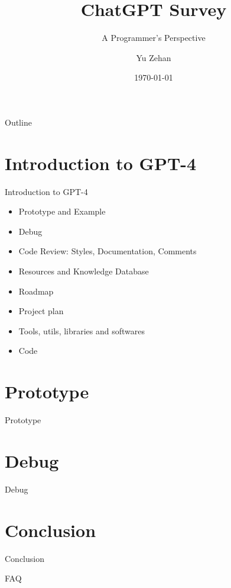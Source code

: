 \documentclass{beamer}
\title{ChatGPT Survey}
\subtitle{A Programmer's Perspective}
\author{Yu Zehan}
\institute{Intel FLEX}
\date{\today}
\begin{document}
\begin{frame}
  \titlepage
\end{frame}

\begin{frame}{Outline}
  \tableofcontents
\end{frame}

\section{Introduction to GPT-4}
\begin{frame}{Introduction to GPT-4}
  \begin{itemize}
    \item Prototype and Example
    \item Debug
    \item Code Review: Styles, Documentation, Comments
    \item Resources and Knowledge Database
    \item Roadmap
    \item Project plan
    \item Tools, utils, libraries and softwares
    \item Code 
  \end{itemize}
\end{frame}

\section{Prototype}
\begin{frame}{Prototype}
\end{frame}

\section{Debug}
\begin{frame}{Debug}
\end{frame}

\section{Conclusion}
\begin{frame}{Conclusion}

\end{frame}

\begin{frame}{FAQ}

\end{frame}
\end{document}
